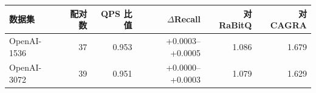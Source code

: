 \begin{tabular}{@{}lrrrrr@{}}
\toprule
数据集 & 配对数 & QPS 比值 & $\Delta$Recall & 对 RaBitQ & 对 CAGRA \\
\midrule
OpenAI-1536 & 37 & 0.953 & +0.0003--+0.0005 & 1.086 & 1.679 \\
OpenAI-3072 & 39 & 0.951 & +0.0000--+0.0003 & 1.079 & 1.629 \\
\bottomrule
\end{tabular}
